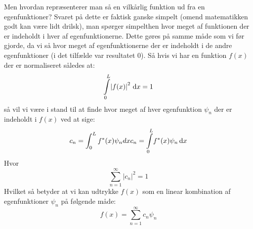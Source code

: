 \documentclass[../Kvantemekanik.tex]{subfiles}
\begin{document}
Men hvordan repræsenterer man så en vilkårlig funktion ud fra en egenfunktioner? Svaret på dette er faktisk ganske simpelt (omend matematikken godt kan være lidt drilsk), man spørger simpelthen hvor meget af funktionen der er indeholdt i hver af egenfunktionerne. Dette gøres på samme måde som vi før gjorde, da vi så hvor meget af egenfunktionerne der er indeholdt i de andre egenfunktioner (i det tilfælde var resultatet 0). Så hvis vi har en funktion $f(x)$ der er normaliseret således at:
\begin{equation*}
    \integral{\abs{f(x)}^2}{x}{0}{L} = 1
\end{equation*}
så vil vi være i stand til at finde hvor meget af hver egenfunktion $\psi_n$ der er indeholdt i $f(x)$ ved at sige:
\begin{equation}
c_n=\int_{0}^{L}f^*(x)\psi_n dx  
c_n= \integral{f^*(x)\psi_n}{x}{0}{L}
\label{kvant:eq:proj}
\end{equation}
Hvor
\begin{equation*}
    \sum_{n=1}^{\infty}|c_n|^2=1
\end{equation*}
Hvilket så betyder at vi kan udtrykke $f(x)$ som en linear kombination af egenfunktioner $\psi_n$ på følgende måde:
\begin{equation}
    f(x)=\sum_{n=1}^{\infty}c_{n}\psi_{n}
\end{equation}
\end{document}
